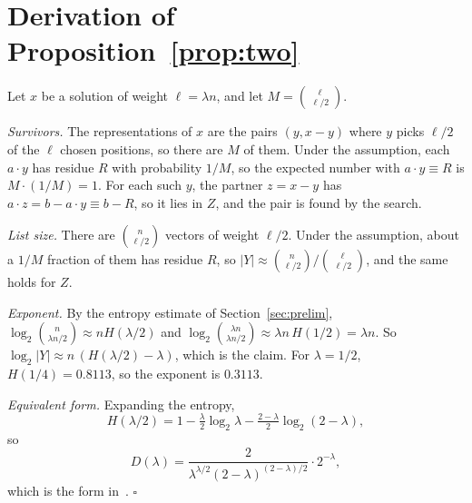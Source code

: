 \documentclass[conference]{IEEEtran}
\begin{document}
\appendices
\section{Derivation of Proposition~\ref{prop:two}}\label{app:two}
Let $x$ be a solution of weight $\ell=\lambda n$, and let $M=\binom{\ell}{\ell/2}$.

\emph{Survivors.} The representations of $x$ are the pairs $(y,x-y)$ where $y$
picks $\ell/2$ of the $\ell$ chosen positions, so there are $M$ of them. Under
the assumption, each $a\cdot y$ has residue $R$ with probability $1/M$, so the
expected number with $a\cdot y\equiv R$ is $M\cdot(1/M)=1$. For each such $y$,
the partner $z=x-y$ has $a\cdot z=b-a\cdot y\equiv b-R$, so it lies in $Z$, and
the pair is found by the search.

\emph{List size.} There are $\binom{n}{\ell/2}$ vectors of weight $\ell/2$. Under
the assumption, about a $1/M$ fraction of them has residue $R$, so
$|Y|\approx\binom{n}{\ell/2}/\binom{\ell}{\ell/2}$, and the same holds for $Z$.

\emph{Exponent.} By the entropy estimate of Section~\ref{sec:prelim},
$\log_2\binom{n}{\lambda n/2}\approx nH(\lambda/2)$ and
$\log_2\binom{\lambda n}{\lambda n/2}\approx \lambda n\,H(1/2)=\lambda n$. So
$\log_2|Y|\approx n\,(H(\lambda/2)-\lambda)$, which is the claim. For
$\lambda=1/2$, $H(1/4)=0.8113$, so the exponent is $0.3113$.

\emph{Equivalent form.} Expanding the entropy,
\[
H(\lambda/2)=1-\tfrac{\lambda}{2}\log_2\lambda-\tfrac{2-\lambda}{2}\log_2(2-\lambda),
\]
so
\[
D(\lambda)=\frac{2}{\lambda^{\lambda/2}(2-\lambda)^{(2-\lambda)/2}}\cdot2^{-\lambda},
\]
which is the form in~\cite[Sec.~4.1]{hgj}. \hfill$\square$
\end{document}
